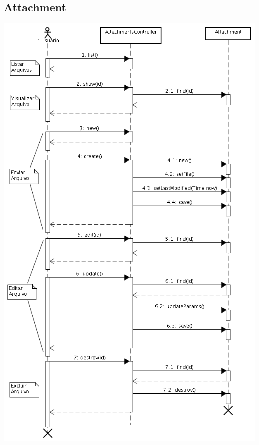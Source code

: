 \documentclass[11pt]{article}
\begin{document}
\subsection{Attachment}
\includegraphics[width=130truemm]{seq_attachment.png}
\end{document}
